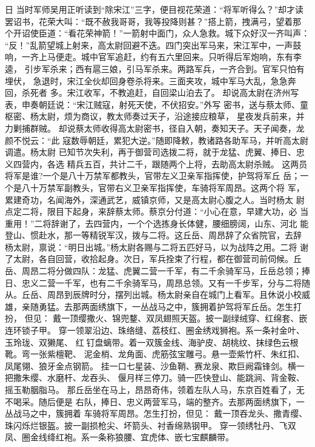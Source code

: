 日
当时军师吴用正听读到“除宋江”三字，便目视花荣道：“将军听得么？”却才读
罢诏书，花荣大叫：“既不赦我哥哥，我等投降则甚？”搭上箭，拽满弓，望着那
个开诏使臣道：“看花荣神箭！”一箭射中面门，众人急救。城下众好汉一齐叫声：
“反！”乱箭望城上射来，高太尉回避不迭。四门突出军马来，宋江军中，一声鼓
响，一齐上马便走。城中官军追赶，约有五六里回来。只听得后军炮响，东有李逵，
引步军杀来；西有扈三娘，引马军杀来。两路军兵，一齐合到。官军只怕有埋伏，
急退时，宋江全伙却回身卷杀将来。三面夹攻，城中军马大乱，急急奔回，杀死者
多。宋江收军，不教追赶，自回梁山泊去了。
却说高太尉在济州写表，申奏朝廷说：“宋江贼寇，射死天使，不伏招安。”外写
密书，送与蔡太师、童枢密、杨太尉，烦为商议，教太师奏过天子，沿途接应粮草，
星夜发兵前来，并力剿捕群贼。
却说蔡太师收得高太尉密书，径自入朝，奏知天子。天子闻奏，龙颜不悦云：“此
寇数辱朝廷，累犯大逆。”随即降敕，教诸路各助军马，并听高太尉调遣。杨太尉
已知节次失利，再于御营司选拨二将，就于龙猛、虎翼、捧日、忠义四营内，各选
精兵五百，共计二千，跟随两个上将，去助高太尉杀贼。
这两员将军是谁?一个是八十万禁军都教头，官带左义卫亲军指挥使，护驾将军丘
岳；一个是八十万禁军副教头，官带右义卫亲军指挥使，车骑将军周昂。这两个将
军，累建奇功，名闻海外，深通武艺，威镇京师，又是高太尉心腹之人。当时杨太
尉点定二将，限目下起身，来辞蔡太师。蔡京分付道：“小心在意，早建大功，必
当重用！”二将辞谢了，去四营内，一个个选拣身长体健，腰细膀阔，山东、河北
能登山、惯赴水，那一等精锐军汉，拨与二将。这丘岳、周昂辞了众省院官，去辞
杨太尉，禀说：“明日出城。”杨太尉各赐与二将五匹好马，以为战阵之用。二将
谢了太尉，各自回营，收拾起身。次日，军兵拴束了行程，都在御营司前伺候。丘
岳、周昂二将分做四队：龙猛、虎翼二营一千军，有二千余骑军马，丘岳总领；捧
日、忠义二营一千军，也有二千余骑军马，周昂总领。又有一千步军，分与二将随
从。丘岳、周昂到辰牌时分，摆列出城。杨太尉亲自在城门上看军。且休说小校威
雄，亲随勇猛。去那两面绣旗下，一丛战马之中，簇拥着护驾将军丘岳。怎生打扮，
但见：
戴一顶缨撒火、锦兜鍪、双凤翅照天盔。披一副绿绒穿、红绵套、嵌连环锁子甲。
穿一领翠沿边、珠络缝、荔枝红、圈金绣戏狮袍。系一条衬金叶、玉玲珑、双獭尾、
红钉盘螭带。着一双簇金线、海驴皮、胡桃纹、抹绿色云根靴。弯一张紫檀靶、
泥金梢、龙角面、虎筋弦宝雕弓。悬一壶紫竹杆、朱红扣、凤尾翎、狼牙金点钢箭。
挂一口七星装、沙鱼鞘、赛龙泉、欺巨阙霜锋剑。横一把撒朱缨、水磨杆、龙吞头、
偃月样三停刀。骑一匹快登山、能跳涧、背金鞍、摇玉勒胭脂马。
那丘岳坐在马上，昂昂奇伟，领着左队人马，东京百姓看了，无不喝采。随后便是
右队，捧日、忠义两营军马，端的整齐。去那两面绣旗下，一丛战马之中，簇拥着
车骑将军周昂。怎生打扮，但见：
戴一顶吞龙头、撒青缨、珠闪烁烂银盔。披一副损枪尖、坏箭头、衬香绵熟钢甲。
穿一领绣牡丹、飞双凤、圈金线绛红袍。系一条称狼腰、宜虎体、嵌七宝麒麟带。
